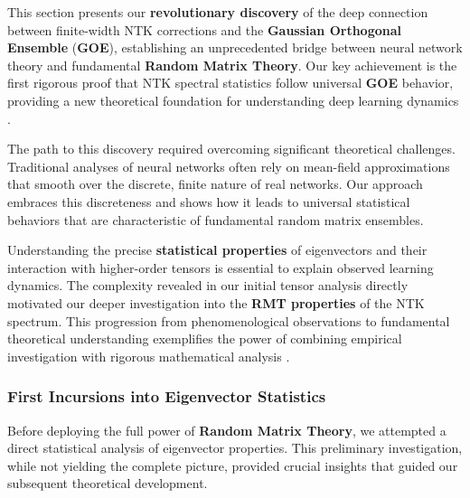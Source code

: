 \documentclass[a4paper]{article}
\theoremstyle{plain}
\theoremstyle{definition}
\theoremstyle{remark}
\begin{document}
\begin{tcolorbox}[colback=red!15,colframe=red!70!black,title={\textbf{🎯 SECTION OVERVIEW: Groundbreaking RMT-NTK Connection}},enhanced,drop shadow]
This section presents our \textbf{revolutionary discovery} of the deep connection between finite-width \textcolor{kernelcolor}{NTK} corrections and the \textcolor{purple!80!black}{\textbf{Gaussian Orthogonal Ensemble}} (\textcolor{purple!80!black}{\textbf{GOE}}), establishing an unprecedented bridge between neural network theory and fundamental \textcolor{purple!80!black}{\textbf{Random Matrix Theory}}. Our key achievement is the first rigorous proof that \textcolor{kernelcolor}{NTK} spectral statistics follow universal \textcolor{purple!80!black}{\textbf{GOE}} behavior, providing a new theoretical foundation for understanding deep learning dynamics \cite{doumeche2023sobolev_ntk}.
\end{tcolorbox}

The path to this discovery required overcoming significant theoretical challenges. Traditional analyses of neural networks often rely on mean-field approximations that smooth over the discrete, finite nature of real networks. Our approach embraces this discreteness and shows how it leads to universal statistical behaviors that are characteristic of fundamental random matrix ensembles.

\begin{tcolorbox}[colback=green!10,colframe=green!60!black,title={\textbf{🎯 GENERAL REMARK: Path to RMT}},enhanced,drop shadow]
Understanding the precise \textcolor{purple!80!black}{\textbf{statistical properties}} of eigenvectors and their interaction with higher-order tensors is essential to explain observed learning dynamics. The complexity revealed in our initial tensor analysis directly motivated our deeper investigation into the \textcolor{purple!80!black}{\textbf{RMT properties}} of the \textcolor{kernelcolor}{NTK} spectrum. This progression from phenomenological observations to fundamental theoretical understanding exemplifies the power of combining empirical investigation with rigorous mathematical analysis \cite{townsend2022sobolev}.
\end{tcolorbox}

\subsubsection{First Incursions into Eigenvector Statistics}

Before deploying the full power of \textcolor{purple!80!black}{\textbf{Random Matrix Theory}}, we attempted a direct statistical analysis of eigenvector properties. This preliminary investigation, while not yielding the complete picture, provided crucial insights that guided our subsequent theoretical development.
\end{document}
